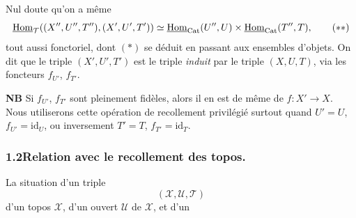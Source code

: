 Nul doute qu'on a même
\[
\underline{\mathrm{Hom}}_{\mathcal{T}}((X'',U'',T''),(X',U',T')) \simeq \underline{\mathrm{Hom}}_{\mathrm{Cat}}(U'',U) \times \underline{\mathrm{Hom}}_{\mathrm{Cat}}(T'',T), \tag*{$(**)$}
\]
tout aussi fonctoriel, dont $(*)$ se déduit en passant aux ensembles d'objets. On dit que le triple $(X',U',T')$ est le triple \textit{induit} par le triple $(X,U,T)$, via les foncteurs $f_{U'}$, $f_{T'}$.

\textbf{NB} Si $f_{U'}$, $f_{T'}$ sont pleinement fidèles, alors il en est de même de $f : X' \longrightarrow X$. Nous utiliserons cette opération de recollement privilégié surtout quand $U' = U$, $f_{U'} = \mathrm{id}_U$, ou inversement $T' = T$, $f_{T'} = \mathrm{id}_T$.

\subsubsection*{1.2\quad Relation avec le recollement des topos.}

La situation d'un triple
\[
(\mathcal{X},\mathcal{U},\mathcal{T})
\]
d'un topos $\mathcal{X}$, d'un ouvert $\mathcal{U}$ de $\mathcal{X}$, et d'un


